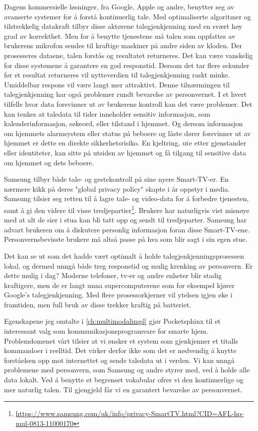 Dagens kommersielle løsninger, fra Google, Apple og andre, benytter seg av avanserte systemer for å forstå kontinuerlig tale. Med optimaliserte algoritmer og tilstrekkelig datakraft tilbyr disse aktørene talegjenkjenning med en svært høy grad av korrekthet. Men for å benytte tjenestene må talen som oppfattes av brukerens mikrofon sendes til kraftige maskiner på andre siden av kloden. Der prosesseres dataene, talen forstås og resultatet returneres. Det kan være vanskelig for disse systemene å garantere en god responstid. Dersom det tar flere sekunder før et resultat returneres vil nytteverdien til talegjenkjenning raskt minke. Umiddelbar respons vil være langt mer attraktivt. Denne tilnærmingen til talegjenkjenning har også problemer rundt bevarelse av personvernet. I et hvert tilfelle hvor data forsvinner ut av brukerens kontroll kan det være problemer. Det kan tenkes at taledata til tider inneholder sensitiv informasjon, som kalenderinformasjon, søkeord, eller tilstand i hjemmet. Og dersom informasjon om hjemmets alarmsystem eller status på beboere og låste dører forsvinner ut av hjemmet er dette en direkte sikkerhetsrisiko. En kjeltring, ute etter gjenstander eller identiteter, kan sitte på utsiden av hjemmet og få tilgang til sensitive data om hjemmet og dets beboere.

Samsung tilbyr både tale- og gestekontroll på sine nyere Smart-TV-er. En nærmere kikk på deres "global privacy policy" skapte i år oppstyr i media. Samsung tilsier seg retten til å lagre tale- og video-data for å forbedre tjenesten, samt å gi den videre til visse tredjepartier\footnote{\url{https://www.samsung.com/uk/info/privacy-SmartTV.html?CID=AFL-hq-mul-0813-11000170}}. Brukere har naturligvis vist misnøye med at alt de sier i stua kan bli tatt opp og sendt til tredjeparter. Samsung har advart brukeren om å diskutere personlig informasjon foran disse Smart-TV-ene. Personvernsbevisste brukere må altså passe på hva som blir sagt i sin egen stue.

Det kan se ut som det hadde vært optimalt å holde talegjenkjenningsprosessen lokal, og dermed unngå både treg responstid og mulig krenking av personvern. Er dette mulig i dag? Moderne telefoner, tv-er og andre enheter blir stadig kraftigere, men de er langt unna supercomputerene som for eksempel kjører Google's talegjenkjenning. Med flere prosessorkjerner vil ytelsen igjen øke i framtiden, men full bruk av disse trekker kraftig på batteriet.

Egenskapene jeg omtalte i \ref{ch:multimodalimpl} gjør Pocketsphinx til et interessant valg som kommunikasjonsprogramvare for smarte hjem. Problemdomenet vårt tilsier at vi ønsker et system som gjenkjenner et titalls kommandoer i reelltid. Det virker derfor ikke som det er nødvendig å knytte forståelsen opp mot internettet og sende taledata ut i verden. Vi kan unngå problemene med personvern, som Samsung og andre styrer med, ved å holde alle data lokalt. Ved å benytte et begrenset vokabular ofrer vi den kontinuerlige og mer naturlig talen. Til gjengjeld får vi en garantert bevarelse av personvernet.

